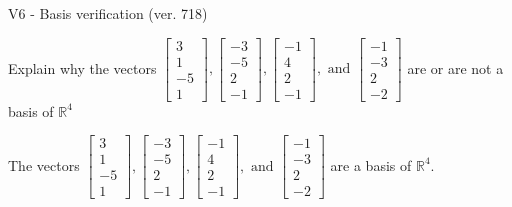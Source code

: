\begin{exercise}
  \begin{exerciseTitle}V6 - Basis verification (ver. 718)\end{exerciseTitle}
  \begin{exerciseStatement}
    Explain why the vectors \(\left[\begin{array}{r}
3 \\
1 \\
-5 \\
1
\end{array}\right] , \left[\begin{array}{r}
-3 \\
-5 \\
2 \\
-1
\end{array}\right] , \left[\begin{array}{r}
-1 \\
4 \\
2 \\
-1
\end{array}\right] , \text{ and } \left[\begin{array}{r}
-1 \\
-3 \\
2 \\
-2
\end{array}\right]\) are or are not a basis of \(\mathbb{R}^4\)	


  \end{exerciseStatement}
  \begin{exerciseAnswer}
   The vectors \(\left[\begin{array}{r}
3 \\
1 \\
-5 \\
1
\end{array}\right] , \left[\begin{array}{r}
-3 \\
-5 \\
2 \\
-1
\end{array}\right] , \left[\begin{array}{r}
-1 \\
4 \\
2 \\
-1
\end{array}\right] , \text{ and } \left[\begin{array}{r}
-1 \\
-3 \\
2 \\
-2
\end{array}\right]\) 
  	 are  a basis of \(\mathbb{R}^4\).
  


  \end{exerciseAnswer}
\end{exercise}